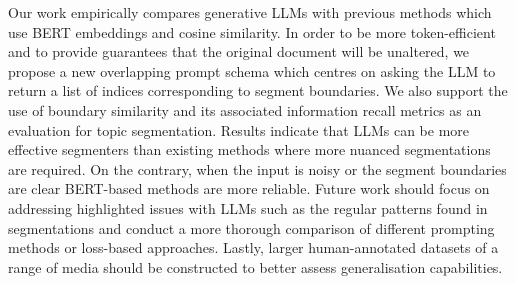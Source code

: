 
Our work empirically compares generative LLMs with previous methods which use BERT embeddings and cosine similarity. In order to be more token-efficient and to provide guarantees that the original document will be unaltered, we propose a new overlapping prompt schema which centres on asking the LLM to return a list of indices corresponding to segment boundaries. We also support the use of boundary similarity and its associated information recall metrics as an evaluation for topic segmentation. Results indicate that LLMs can be more effective segmenters than existing methods where more nuanced segmentations are required. On the contrary, when the input is noisy or the segment boundaries are clear BERT-based methods are more reliable. Future work should focus on addressing highlighted issues with LLMs such as the regular patterns found in segmentations and conduct a more thorough comparison of different prompting methods or loss-based approaches. Lastly, larger human-annotated datasets of a range of media should be constructed to better assess generalisation capabilities.